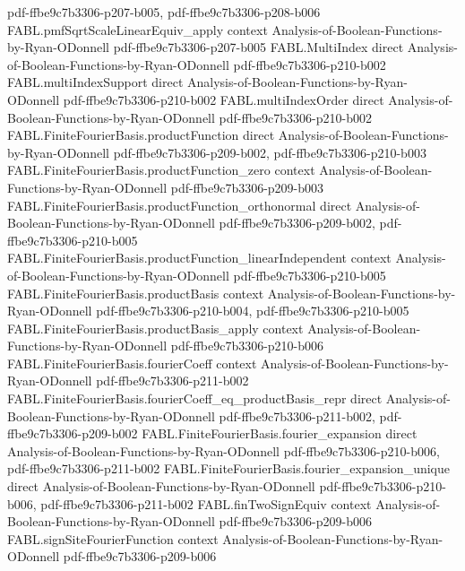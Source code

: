\begin{theorem}
  {pdf-ffbe9c7b3306-p207-b005,
    pdf-ffbe9c7b3306-p208-b006}
\proofstep
  {FABL.pmfSqrtScaleLinearEquiv_apply}
  {context}
  {Analysis-of-Boolean-Functions-by-Ryan-ODonnell}
  {pdf-ffbe9c7b3306-p207-b005}
\proofstep
  {FABL.MultiIndex}
  {direct}
  {Analysis-of-Boolean-Functions-by-Ryan-ODonnell}
  {pdf-ffbe9c7b3306-p210-b002}
\proofstep
  {FABL.multiIndexSupport}
  {direct}
  {Analysis-of-Boolean-Functions-by-Ryan-ODonnell}
  {pdf-ffbe9c7b3306-p210-b002}
\proofstep
  {FABL.multiIndexOrder}
  {direct}
  {Analysis-of-Boolean-Functions-by-Ryan-ODonnell}
  {pdf-ffbe9c7b3306-p210-b002}
\proofstep
  {FABL.FiniteFourierBasis.productFunction}
  {direct}
  {Analysis-of-Boolean-Functions-by-Ryan-ODonnell}
  {pdf-ffbe9c7b3306-p209-b002,
    pdf-ffbe9c7b3306-p210-b003}
\proofstep
  {FABL.FiniteFourierBasis.productFunction_zero}
  {context}
  {Analysis-of-Boolean-Functions-by-Ryan-ODonnell}
  {pdf-ffbe9c7b3306-p209-b003}
\proofstep
  {FABL.FiniteFourierBasis.productFunction_orthonormal}
  {direct}
  {Analysis-of-Boolean-Functions-by-Ryan-ODonnell}
  {pdf-ffbe9c7b3306-p209-b002,
    pdf-ffbe9c7b3306-p210-b005}
\proofstep
  {FABL.FiniteFourierBasis.productFunction_linearIndependent}
  {context}
  {Analysis-of-Boolean-Functions-by-Ryan-ODonnell}
  {pdf-ffbe9c7b3306-p210-b005}
\proofstep
  {FABL.FiniteFourierBasis.productBasis}
  {context}
  {Analysis-of-Boolean-Functions-by-Ryan-ODonnell}
  {pdf-ffbe9c7b3306-p210-b004,
    pdf-ffbe9c7b3306-p210-b005}
\proofstep
  {FABL.FiniteFourierBasis.productBasis_apply}
  {context}
  {Analysis-of-Boolean-Functions-by-Ryan-ODonnell}
  {pdf-ffbe9c7b3306-p210-b006}
\proofstep
  {FABL.FiniteFourierBasis.fourierCoeff}
  {context}
  {Analysis-of-Boolean-Functions-by-Ryan-ODonnell}
  {pdf-ffbe9c7b3306-p211-b002}
\proofstep
  {FABL.FiniteFourierBasis.fourierCoeff_eq_productBasis_repr}
  {direct}
  {Analysis-of-Boolean-Functions-by-Ryan-ODonnell}
  {pdf-ffbe9c7b3306-p211-b002,
    pdf-ffbe9c7b3306-p209-b002}
\proofstep
  {FABL.FiniteFourierBasis.fourier_expansion}
  {direct}
  {Analysis-of-Boolean-Functions-by-Ryan-ODonnell}
  {pdf-ffbe9c7b3306-p210-b006,
    pdf-ffbe9c7b3306-p211-b002}
\proofstep
  {FABL.FiniteFourierBasis.fourier_expansion_unique}
  {direct}
  {Analysis-of-Boolean-Functions-by-Ryan-ODonnell}
  {pdf-ffbe9c7b3306-p210-b006,
    pdf-ffbe9c7b3306-p211-b002}
\proofstep
  {FABL.finTwoSignEquiv}
  {context}
  {Analysis-of-Boolean-Functions-by-Ryan-ODonnell}
  {pdf-ffbe9c7b3306-p209-b006}
\proofstep
  {FABL.signSiteFourierFunction}
  {context}
  {Analysis-of-Boolean-Functions-by-Ryan-ODonnell}
  {pdf-ffbe9c7b3306-p209-b006}
\proofstep

\end{theorem}
